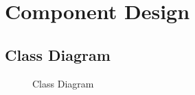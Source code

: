 \documentclass[11pt,fleqn]{book} %
\begin{document}
\newpage
\section{Component Design} 
\subsection{Class Diagram}
 \begin{center}
	\begin{figure}[!htbp]
		\centering
	  \caption{Class Diagram}
	  \label{fig:class-dig}
	\end{figure}
\end{center} 
\newpage
\end{document}
